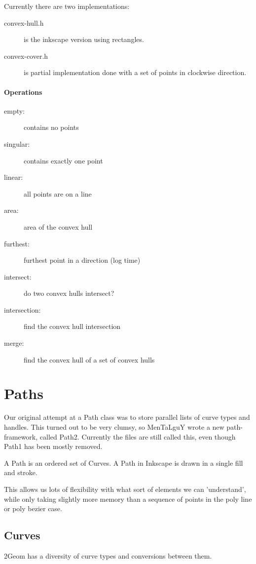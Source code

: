 \documentclass{book}
\newcommand{\code}[1]{\textsf{#1}}
\begin{document}
Currently there are two implementations:
\begin{description}
\item[convex-hull.h] is the inkscape version using rectangles.
\item[convex-cover.h] is partial implementation done with a set of points in clockwise direction.
\end{description}

\subsubsection{Operations}
\begin{description}
\item[empty:] contains no points
\item[singular:] contains exactly one point
\item[linear:] all points are on a line
\item[area:] area of the convex hull
\item[furthest:] furthest point in a direction (log time)
\item[intersect:] do two convex hulls intersect?
\item[intersection:] find the convex hull intersection
\item[merge:] find the convex hull of a set of convex hulls
\end{description}

\chapter{Paths}

Our original attempt at a \code{Path} class was to store parallel
lists of curve types and handles.  This turned out to be very clumsy,
so MenTaLguY wrote a new path-framework, called Path2.  Currently the
files are still called this, even though Path1 has been mostly
removed.

A \code{Path} is an ordered set of \code{Curve}s.  A \code{Path} in
Inkscape is drawn in a single fill and stroke.

This allows us lots of flexibility with what sort of elements we can
'understand', while only taking slightly more memory than a sequence
of points in the poly line or poly bezier case. 

\section{Curves}
2Geom has a diversity of curve types and conversions between them.
\end{document}
